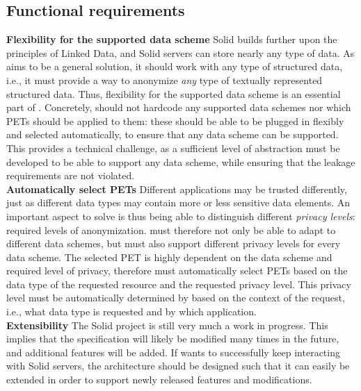 \subsection{Functional requirements}
\noindent \textbf{Flexibility for the supported data scheme} Solid builds further upon the principles of Linked Data, and Solid servers can store nearly any type of data. As \middleware{} aims to be a general solution, it should work with any type of structured data, i.e., it must provide a way to anonymize \textit{any} type of textually represented structured data. Thus, flexibility for the supported data scheme is an essential part of \middleware{}. Concretely, \middleware{} should not hardcode any supported data schemes nor which \gls{PETs} should be applied to them: these should be able to be plugged in flexibly and selected automatically, to ensure that any data scheme can be supported. This provides a technical challenge, as a sufficient level of abstraction must be developed to be able to support any data scheme, while ensuring that the leakage requirements are not violated. \\

\noindent \textbf{Automatically select \gls{PETs}} Different applications may be trusted differently, just as different data types may contain more or less sensitive data elements. An important aspect to solve is thus being able to distinguish different \textit{privacy levels}: required levels of anonymization. \middleware{} must therefore not only be able to adapt to different data schemes, but must also support different privacy levels for every data scheme. The selected PET is highly dependent on the data scheme and required level of privacy, therefore \middleware{} must automatically select \gls{PETs} based on the data type of the requested resource and the requested privacy level. This privacy level must be automatically determined by \middleware{} based on the context of the request, i.e., what data type is requested and by which application. \\

\noindent \textbf{Extensibility} The Solid project is still very much a work in progress. This implies that the specification will likely be modified many times in the future, and additional features will be added. If \middleware{} wants to successfully keep interacting with Solid servers, the architecture should be designed such that it can easily be extended in order to support newly released features and modifications. \\

